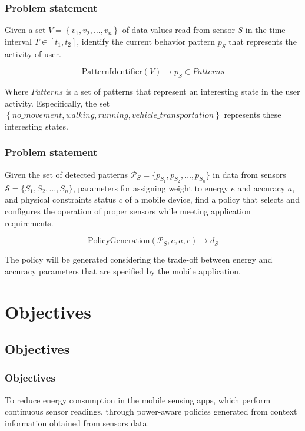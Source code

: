 \documentclass[compress,9pt,xcolor={dvipsnames,table}]{beamer}
\begin{document}
\begin{frame}\frametitle{Problem statement}
\begin{tcolorbox}[title=Problem statement: Mobility pattern identification,colframe=PineGreen]
\small
Given a set $V = \left\{v_{1}, v_{2}, \dotsc, v_{n}\right\}$ of data values read from sensor $S$ in the time interval $T  \in [t_{1}, t_{2}]$, identify the current behavior pattern $p_{S}$ that represents the activity of user.

\begin{equation}
  \text{PatternIdentifier}( V ) \longrightarrow{} p_{S} \in Patterns
\end{equation}

Where $Patterns$ is a set of patterns that represent an interesting state in the user activity.
Especifically, the set $\left\{no\_movement, walking, running, vehicle\_transportation\right\}$ represents these interesting states.
\end{tcolorbox}
\end{frame}

\begin{frame}\frametitle{Problem statement}
\begin{tcolorbox}[title=Problem statement: Policy generation,colframe=PineGreen]
\small
Given the set of detected patterns $\mathcal{P}_{S} = \{ p_{S_1}, p_{S_2}, \ldots, p_{S_n} \}$ in data from sensors $\mathcal{S} = \{ S_1,S_2,\ldots, S_n \}$, parameters for assigning weight to energy $e$ and accuracy $a$, and physical constraints status $c$ of a mobile device, find a policy that selects and configures the operation of proper sensors while meeting application requirements.

\begin{equation}
  \text{PolicyGeneration}( \mathcal{P}_{S}, e, a, c ) \longrightarrow{} d_{S}
\end{equation}

The policy will be generated considering the trade-off between energy and accuracy parameters that are specified by the mobile application.
\end{tcolorbox}
\end{frame}

\section{Objectives}
\subsection{Objectives}
\begin{frame}\frametitle{Objectives}
\begin{tcolorbox}[title=Main objective,colframe=PineGreen]
To reduce energy consumption in the mobile sensing apps, which perform continuous sensor readings, through power-aware policies generated from context information obtained from sensors data.
\end{tcolorbox}
\end{frame}
\end{document}
